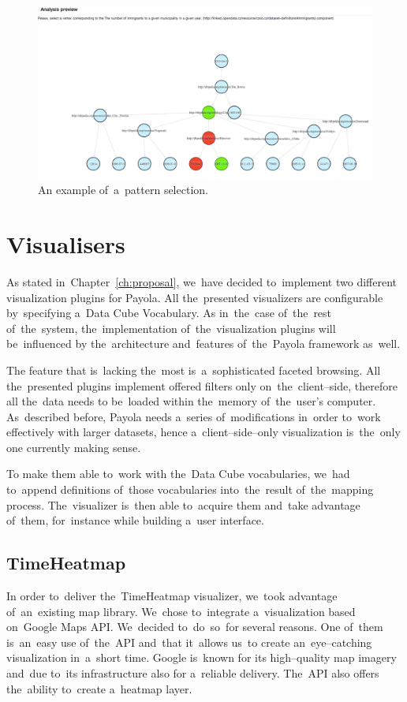 \begin{figure}
	\centering
	\includegraphics[width=140mm]{img/pattern-selection.png}
	\caption{An example of~a~pattern selection.}
	\label{fig:pattern-selection}
\end{figure}

\section{Visualisers}
As stated in~Chapter~\ref{ch:proposal}, we~have decided to~implement two 
different visualization plugins for Payola. All the~presented 
visualizers are configurable by~specifying a~Data Cube Vocabulary.
As in~the~case of~the~rest of~the~system, the~implementation of~the~visualization plugins will be~influenced 
by the~architecture and~features of~the~Payola framework as~well.

The feature that is~lacking the~most  is~a~sophisticated faceted browsing. All the~presented plugins 
implement offered filters only on~the~client--side, therefore all the~data needs 
to be~loaded within the~memory of~the~user’s computer. As~described before, Payola 
needs a~series of~modifications in~order to~work effectively with larger 
datasets, hence a~client--side--only visualization is~the~only one currently making sense.

To make them able to~work with the~Data Cube vocabularies, we~had to~append 
definitions of~those vocabularies into~the~result of~the~mapping process. The~visualizer is~then able to~acquire them and~take advantage 
of~them,
for~instance while building a~user interface.

\subsection{TimeHeatmap}
In order to~deliver the~TimeHeatmap visualizer, we~took advantage of~an~existing 
map library. We~chose to~integrate a~visualization based on~Google Maps API. We~decided to~do~so~for several reasons. One of~them is~an~easy use of~the~API and~that it~allows us~to
create an~eye--catching visualization in~a~short 
time. Google is~known for its high--quality map imagery and~due to~its 
infrastructure also for a~reliable delivery. The~API also offers the~ability to~create a~heatmap layer.


